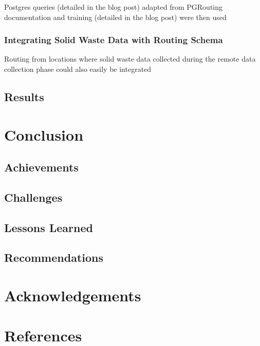 \documentclass[a4paper,12pt,twoside]{article}
\begin{document}
    Postgres queries (detailed in the blog post) adapted from PGRouting documentation and training (detailed in the blog post) were then used 

\subsubsection{Integrating Solid Waste Data with Routing Schema}
    Routing from locations where solid waste data collected during the remote data collection phase could also easily be integrated 
\subsection{Results}

\section{Conclusion}

    \begin{multicols}{2}
    \lipsum[0-5]
    \end{multicols}

\subsection{Achievements}

    \begin{multicols}{2}
    \lipsum[0-5]
    \end{multicols}

\subsection{Challenges}

    \begin{multicols}{2}
    \lipsum[0-5]
    \end{multicols}

\subsection{Lessons Learned}

    \begin{multicols}{2}
    \lipsum[0-5]
    \end{multicols}
    
\subsection{Recommendations}

    \begin{multicols}{2}
    \lipsum[0-5]
    \end{multicols}

\section{Acknowledgements}

    \begin{multicols}{2}
    \lipsum[0-5]
    \end{multicols}

\section{References}

    \begin{multicols}{2}
    \lipsum[0-5]
    \end{multicols}
\end{document}
